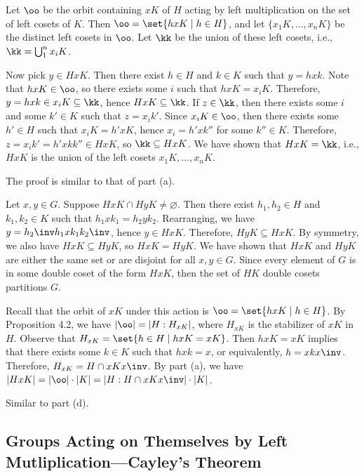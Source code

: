 \begin{solalph}
	\item Let $\oo$ be the orbit containing $xK$ of $H$ acting by left multiplication on the set of left cosets of $K$. Then $\oo = \set{hxK \mid h \in H}$, and let $\{x_1K, \ldots, x_nK\}$ be the distinct left cosets in $\oo$. Let $\kk$ be the union of these left cosets, i.e., $\kk = \bigcup_1^n x_iK$.
	
	Now pick $y \in HxK$. Then there exist $h \in H$ and $k \in K$ such that $y = hxk$. Note that $hxK \in \oo$, so there exists some $i$ such that $hxK = x_iK$. Therefore, $y = hxk \in x_iK \subseteq \kk$, hence $HxK \subseteq \kk$. If $z \in \kk$, then there exists some $i$ and some $k' \in K$ such that $z = x_ik'$. Since $x_iK \in \oo$, then there exists some $h' \in H$ such that $x_iK = h'xK$, hence $x_i = h'xk''$ for some $k'' \in K$. Therefore, $z = x_ik' = h'xkk'' \in HxK$, so $\kk \subseteq HxK$. We have shown that $HxK = \kk$, i.e., $HxK$ is the union of the left cosets $x_1K, \ldots, x_nK$.
	\item The proof is similar to that of part (a). 
	\item Let $x, y \in G$. Suppose $HxK \cap HyK \neq \varnothing$. Then there exist $h_1, h_2 \in H$ and $k_1, k_2 \in K$ such that $h_1 x k_1 = h_2 y k_2$. Rearranging, we have $y = h_2\inv h_1 x k_1 k_2\inv$, hence $y \in HxK$. Therefore, $HyK \subseteq HxK$. By symmetry, we also have $HxK \subseteq HyK$, so $HxK = HyK$. We have shown that $HxK$ and $HyK$ are either the same set or are disjoint for all $x, y \in G$. Since every element of $G$ is in some double coset of the form $HxK$, then the set of $HK$ double cosets partitions $G$.
	\item Recall that the orbit of $xK$ under this action is $\oo = \set{hxK \mid h \in H}$. By Proposition 4.2, we have $|\oo| = |H : H_{xK}|$, where $H_{xK}$ is the stabilizer of $xK$ in $H$. Observe that $H_{xK} = \set{h \in H \mid hxK = xK}$. Then $hxK = xK$ implies that there exists some $k \in K$ such that $hxk = x$, or equivalently, $h = x k x\inv$. Therefore, $H_{xK} = H \cap x K x\inv$. By part (a), we have $|HxK| = |\oo| \cdot |K| = |H : H \cap x K x\inv| \cdot |K|$.
	\item Similar to part (d).
\end{solalph}

\newpage

\subsection{Groups Acting on Themselves by Left Mutliplication---Cayley's Theorem}

